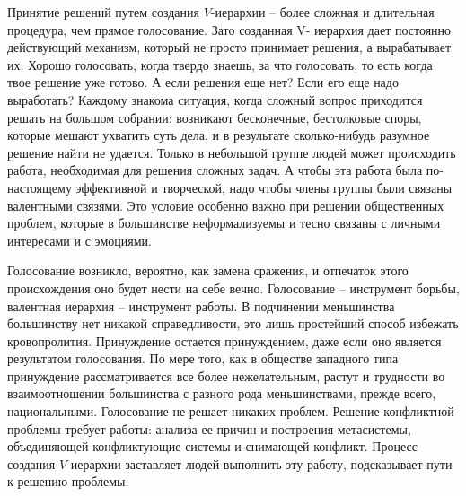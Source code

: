 \documentclass{book}
\begin{document}
Принятие решений путем создания $V$-иерархии -- более слож­ная и длительная процедура, чем прямое голосование. Зато со­зданная V-  иерархия дает постоянно действующий механизм, ко­торый не просто принимает решения, а вырабатывает  их. Хорошо голосовать, когда твердо знаешь, за что голосовать, то есть когда твое решение уже готово. А если решения еще нет? Если его еще надо выработать? Каждому знакома ситуация, когда сложный вопрос приходится решать на большом собрании: возникают бесконечные, бестолковые споры, которые мешают ухватить суть дела, и в результате сколько-нибудь разумное решение най­ти не удается. Только в небольшой группе людей может проис­ходить работа, необходимая для решения сложных задач. А что­бы эта работа была по-настоящему эффективной и творческой, надо чтобы члены группы были связаны валентными связями. Это условие особенно важно при решении общественных проб­лем, которые в большинстве неформализуемы и тесно связаны с личными интересами и с эмоциями.

Голосование возникло, вероятно, как замена сражения, и от­печаток этого происхождения оно будет нести на себе вечно. Голосование -- инструмент борьбы, валентная иерархия -- инст­румент работы. В подчинении меньшинства большинству нет ни­какой справедливости, это лишь простейший способ избежать кровопролития. Принуждение остается принуждением, даже ес­ли оно является результатом голосования. По мере того, как в обществе западного типа принуждение рассматривается все более нежелательным, растут и трудности во взаимоотношении большинства с разного рода меньшинствами, прежде всего, национальными. Голосование не решает никаких проблем. Решение конфликтной проблемы требует работы: анализа ее причин и по­строения метасистемы, объединяющей конфликтующие системы и снимающей конфликт. Процесс создания $V$-иерархии заставля­ет людей выполнить эту работу, подсказывает пути к решению проблемы.
\end{document}
